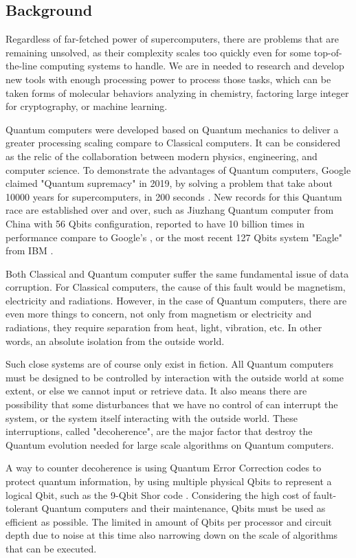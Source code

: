 \subsection{Background}

Regardless of far-fetched power of supercomputers, there are problems that are remaining unsolved, as their complexity scales too quickly even for some top-of-the-line computing systems to handle. 
We are in needed to research and develop new tools with enough processing power to process those tasks, which can be taken forms of molecular behaviors analyzing in chemistry, factoring large integer for cryptography, or machine learning.

Quantum computers were developed based on Quantum mechanics to deliver a greater processing scaling compare to Classical computers.
It can be considered as the relic of the collaboration between modern physics, engineering, and computer science.
To demonstrate the advantages of Quantum computers, Google claimed "Quantum supremacy" in 2019, by solving a problem that take about 10000 years for supercomputers, in 200 seconds \cite{hsuGoogleQuantumTech2019}.
New records for this Quantum race are established over and over, such as Jiuzhang Quantum computer from China with 56 Qbits configuration, reported to have 10 billion times in performance compare to Google's \cite{zhongQuantumComputationalAdvantage2020}, or the most recent 127 Qbits system "Eagle" from IBM \cite{chow2021ibm}.

Both Classical and Quantum computer suffer the same fundamental issue of data corruption.
For Classical computers, the cause of this fault would be magnetism, electricity and radiations.
However, in the case of Quantum computers, there are even more things to concern, not only from magnetism or electricity and radiations, they require separation from heat, light, vibration, etc. In other words, an absolute isolation from the outside world.

Such close systems are of course only exist in fiction. 
All Quantum computers must be designed to be controlled by interaction with the outside world at some extent, or else we cannot input or retrieve data.
It also means there are possibility that some disturbances that we have no control of can interrupt the system, or the system itself interacting with the outside world.
These interruptions, called "decoherence", are the major factor that destroy the Quantum evolution needed for large scale algorithms on Quantum computers.

A way to counter decoherence is using Quantum Error Correction codes \cite{lidar2013quantum} to protect quantum information, by using multiple physical Qbits to represent a logical Qbit, such as the 9-Qbit Shor code \cite{shor1995scheme}.
Considering the high cost of fault-tolerant Quantum computers and their maintenance, Qbits must be used as efficient as possible. 
The limited in amount of Qbits per processor and circuit depth due to noise at this time also narrowing down on the scale of algorithms that can be executed.

